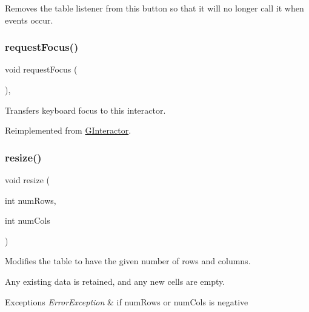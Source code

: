 Removes the table listener from this button so that it will no longer call it when events occur. 

\mbox{\label{classGTable_a5921efd0a5a83eacebdadb749fb3ea7a}} 
\subsubsection{\texorpdfstring{request\+Focus()}{requestFocus()}}
{\footnotesize\ttfamily void request\+Focus (\begin{DoxyParamCaption}{ }\end{DoxyParamCaption})\hspace{0.3cm}{\ttfamily [override]}, {\ttfamily [virtual]}}



Transfers keyboard focus to this interactor. 



Reimplemented from \mbox{\hyperlink{classGInteractor_a519fb2ac767f8b2febbb50b898b8c8cb}{G\+Interactor}}.

\mbox{\label{classGTable_a600810b1a74ec9a062ce38666a9e7602}} 
\subsubsection{\texorpdfstring{resize()}{resize()}}
{\footnotesize\ttfamily void resize (\begin{DoxyParamCaption}\item[{int}]{num\+Rows,  }\item[{int}]{num\+Cols }\end{DoxyParamCaption})\hspace{0.3cm}{\ttfamily [virtual]}}



Modifies the table to have the given number of rows and columns. 

Any existing data is retained, and any new cells are empty. 
\begin{DoxyExceptions}{Exceptions}
{\em Error\+Exception} & if num\+Rows or num\+Cols is negative \\
\hline
\end{DoxyExceptions}
\mbox{\label{classGTable_a92c3dff0296ec16823a1172a9f9f07e6}} 
